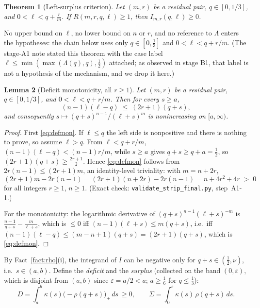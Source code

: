 \documentclass[11pt]{amsart}
\newtheorem{theorem}{Theorem}
\newtheorem{lemma}[theorem]{Lemma}
\theoremstyle{remark}
\begin{document}
\begin{theorem}[Left-surplus criterion]\label{thm:leftsurplus}
Let $(m,r)$ be a residual pair, $q\in[0,1/3]$, and $0<\ell<q+\tfrac rm$.  If $R(m,r,q,\ell)\ge1$, then $I_{m,r}(q,\ell)\ge0$.
\end{theorem}

No upper bound on $\ell$, no lower bound on $n$ or $r$, and no reference to $\Lambda$ enters the hypotheses: the chain below uses only $q\in[0,\tfrac13]$ and $0<\ell<q+r/m$.  (The stage-A1 note stated this theorem with the case label $\ell\le\min(\max(\Lambda(q),q),\tfrac12)$ attached; as observed in stage B1, that label is not a hypothesis of the mechanism, and we drop it here.)

\begin{lemma}[Deficit monotonicity, all $r\ge1$]\label{lem:defmon}
Let $(m,r)$ be a residual pair, $q\in[0,1/3]$, and $0<\ell<q+r/m$.  Then for every $s\ge a$,
\begin{equation}\label{eq:defmon}
        (n-1)(\ell-q)\;\le\;(2r+1)(q+s),
\end{equation}
and consequently $s\mapsto(q+s)^{n-1}/(\ell+s)^{m}$ is nonincreasing on $[a,\infty)$.
\end{lemma}

\begin{proof}
First \eqref{eq:defmon}.  If $\ell\le q$ the left side is nonpositive and there is nothing to prove, so assume $\ell>q$.  From $\ell<q+r/m$,
$(n-1)(\ell-q)<(n-1)r/m$, while $s\ge a$ gives $q+s\ge q+a=\tfrac12$, so $(2r+1)(q+s)\ge\tfrac{2r+1}{2}$.  Hence \eqref{eq:defmon} follows from
$2r(n-1)\le(2r+1)m$, an identity-level triviality: with $m=n+2r$,
\[
        (2r+1)m-2r(n-1)=(2r+1)(n+2r)-2r(n-1)=n+4r^{2}+4r\;>\;0
\]
for all integers $r\ge1$, $n\ge1$.  (Exact check: \texttt{validate\_strip\_final.py}, step~A1-1.)

For the monotonicity: the logarithmic derivative of $(q+s)^{n-1}(\ell+s)^{-m}$ is $\frac{n-1}{q+s}-\frac{m}{\ell+s}$, which is $\le0$ iff $(n-1)(\ell+s)\le m(q+s)$, i.e.\ iff $(n-1)(\ell-q)\le(m-n+1)(q+s)=(2r+1)(q+s)$, which is \eqref{eq:defmon}.
\end{proof}

By Fact~\ref{fact:rho}(i), the integrand of $I$ can be negative only for $q+s\in(\tfrac12,\nu)$, i.e.\ $s\in(a,b)$.  Define the \emph{deficit} and the \emph{surplus} (collected on the band $(0,\varepsilon)$, which is disjoint from $(a,b)$ since $\varepsilon=a/2<a$; $a\ge\tfrac16$ for $q\le\tfrac13$):
\[
        D=\int_a^b \kappa(s)\bigl(-\rho(q+s)\bigr)_+\,ds\ \ge0,
        \qquad
        \Sigma=\int_0^{\varepsilon}\kappa(s)\,\rho(q+s)\,ds .
\]
\end{document}
